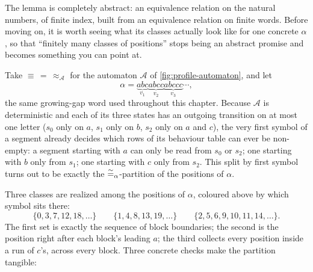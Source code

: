 The lemma is completely abstract: an equivalence relation on the
natural numbers, of finite index, built from an equivalence relation on
finite words.  Before moving on, it is worth seeing what its classes
actually look like for one concrete $\alpha$, so that ``finitely many
classes of positions'' stops being an abstract promise and becomes
something you can point at.

\clearpage
\begin{example}
\label{ex:position-classes-running}
Take $\equiv\,=\,\approx_{\mathcal A}$ for the automaton $\mathcal A$ of
\cref{fig:profile-automaton}, and let
\[
  \alpha =
  \underbrace{abc}_{\textstyle v_1}
  \underbrace{abcc}_{\textstyle v_2}
  \underbrace{abccc}_{\textstyle v_3}\cdots ,
\]
the same growing-gap word used throughout this chapter.  Because
$\mathcal A$ is deterministic and each of its three states has an
outgoing transition on at most one letter ($s_0$ only on $a$, $s_1$
only on $b$, $s_2$ only on $a$ and $c$), the very first symbol of a
segment already decides which rows of its behaviour table can ever be
non-empty: a segment starting with $a$ can only be read from $s_0$ or
$s_2$; one starting with $b$ only from $s_1$; one starting with $c$
only from $s_2$.  This split by first symbol turns out to be exactly
the $\mathrel{\overset{\sim}{=}_{\alpha}}$-partition of the positions of $\alpha$.

\begin{center}
\end{center}

Three classes are realized among the positions of $\alpha$, coloured
above by which symbol sits there:
\[
  \{0,3,7,12,18,\ldots\}
  \qquad
  \{1,4,8,13,19,\ldots\}
  \qquad
  \{2,5,6,9,10,11,14,\ldots\}.
\]
The first set is exactly the sequence of block boundaries; the second
is the position right after each block's leading $a$; the third
collects every position inside a run of $c$'s, across every block.
Three concrete checks make the partition tangible:


\end{example}
